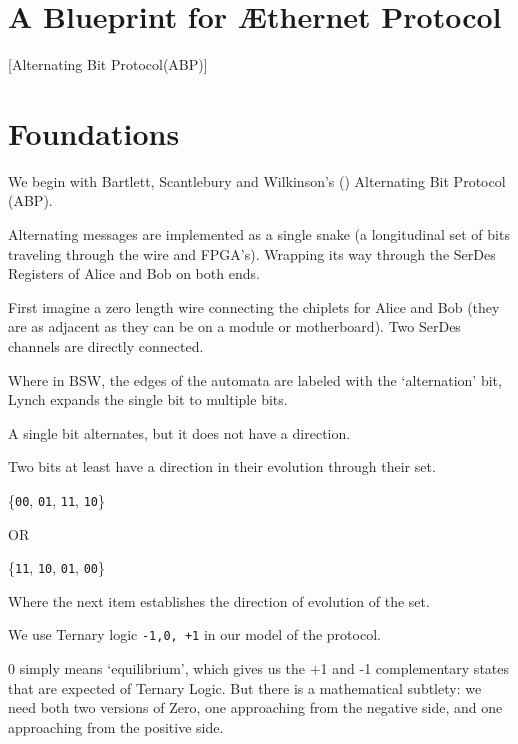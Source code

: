 \documentclass[../../../OAE-SPEC-MAIN.tex]{subfiles}
\begin{document}
\section{A Blueprint for Æthernet Protocol} 

[Alternating Bit Protocol(ABP)]

\section{Foundations}

We begin with Bartlett, Scantlebury and Wilkinson's  (\cite{BSW})  Alternating Bit Protocol (ABP).

Alternating messages are implemented as a single snake (a longitudinal set of bits traveling through the wire and FPGA's). Wrapping its way through the SerDes Registers of Alice and Bob on both ends.

First imagine a zero length wire connecting the chiplets for Alice and Bob (they are as adjacent as they can be on a module or motherboard). Two SerDes channels are directly connected. 

Where in BSW, the edges of the automata are labeled with the `alternation' bit, Lynch expands the single bit to multiple bits.

A single bit alternates, but it does not have a direction.

\begin{highlightbox}
Two bits at least have a direction in their evolution through their set.
\end{highlightbox}

 
	\{\texttt{00}, \texttt{01}, \texttt{11}, \texttt{10}\}
	 
	 \bigskip
	 
	OR
	
	\bigskip
	
	\{\texttt{11}, \texttt{10}, \texttt{01}, \texttt{00}\}
	 
	\bigskip
	
\noindent Where the next item establishes the direction of evolution of the set. 


We use Ternary logic \texttt{-1,0, +1} in our model of the protocol. 

0 simply means `equilibrium', which gives us the +1 and -1 complementary states that are expected of Ternary Logic.  But there is a mathematical subtlety: we need both two versions of Zero, one approaching from the negative side, and one approaching from the positive side.
\end{document}
